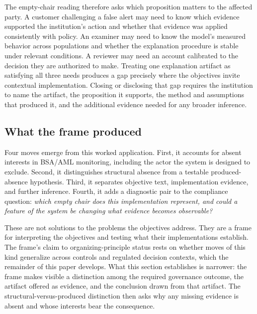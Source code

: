 The empty-chair reading therefore asks which proposition matters to the affected party. A customer challenging a false alert may need to know which evidence supported the institution's action and whether that evidence was applied consistently with policy. An examiner may need to know the model's measured behavior across populations and whether the explanation procedure is stable under relevant conditions. A reviewer may need an account calibrated to the decision they are authorized to make. Treating one explanation artifact as satisfying all three needs produces a gap precisely where the objectives invite contextual implementation. Closing or disclosing that gap requires the institution to name the artifact, the proposition it supports, the method and assumptions that produced it, and the additional evidence needed for any broader inference.

\subsection{What the frame produced}
\label{sec:frame-as-method:what-the-frame-produced}

Four moves emerge from this worked application. First, it accounts for absent interests in BSA/AML monitoring, including the actor the system is designed to exclude. Second, it distinguishes structural absence from a testable produced-absence hypothesis. Third, it separates objective text, implementation evidence, and further inference. Fourth, it adds a diagnostic pair to the compliance question: \emph{which empty chair does this implementation represent, and could a feature of the system be changing what evidence becomes observable?}

These are not solutions to the problems the objectives address. They are a frame for interpreting the objectives and testing what their implementations establish. The frame's claim to organizing-principle status rests on whether moves of this kind generalize across controls and regulated decision contexts, which the remainder of this paper develops. What this section establishes is narrower: the frame makes visible a distinction among the required governance outcome, the artifact offered as evidence, and the conclusion drawn from that artifact. The structural-versus-produced distinction then asks why any missing evidence is absent and whose interests bear the consequence.

